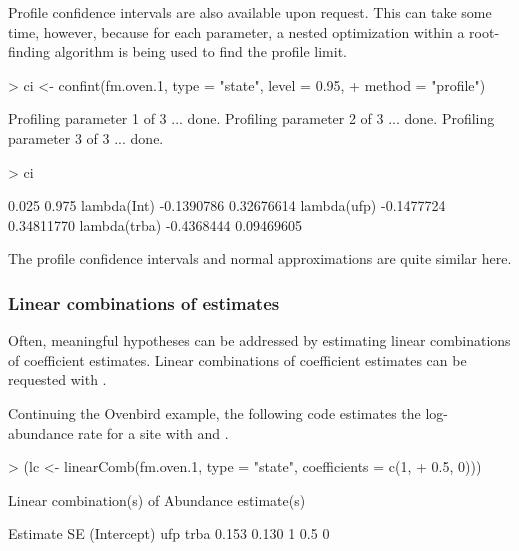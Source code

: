 \documentclass[article,shortnames]{jss}
\begin{document}
Profile confidence intervals are also available upon request.  This
can take some time, however, because for each parameter, a nested
optimization within a root-finding algorithm is being used to find the
profile limit.

\begin{Schunk}
\begin{Sinput}
> ci <- confint(fm.oven.1, type = "state", level = 0.95, 
+     method = "profile")
\end{Sinput}
\begin{Soutput}
Profiling parameter 1 of 3 ... done.
Profiling parameter 2 of 3 ... done.
Profiling parameter 3 of 3 ... done.
\end{Soutput}
\end{Schunk}
\begin{Schunk}
\begin{Sinput}
> ci
\end{Sinput}
\begin{Soutput}
                  0.025      0.975
lambda(Int)  -0.1390786 0.32676614
lambda(ufp)  -0.1477724 0.34811770
lambda(trba) -0.4368444 0.09469605
\end{Soutput}
\end{Schunk}

The profile confidence intervals and normal approximations are quite
similar here.

\subsubsection{Linear combinations of estimates}

Often, meaningful hypotheses can be addressed by estimating linear
combinations of coefficient estimates.  Linear combinations of coefficient
estimates can be requested with .

Continuing the Ovenbird example, the following code estimates the
log-abundance rate for a site with  and .

\begin{Schunk}
\begin{Sinput}
> (lc <- linearComb(fm.oven.1, type = "state", coefficients = c(1, 
+     0.5, 0)))
\end{Sinput}
\begin{Soutput}
Linear combination(s) of Abundance estimate(s)

 Estimate    SE (Intercept) ufp trba
    0.153 0.130           1 0.5    0
\end{Soutput}
\end{Schunk}
\end{document}
